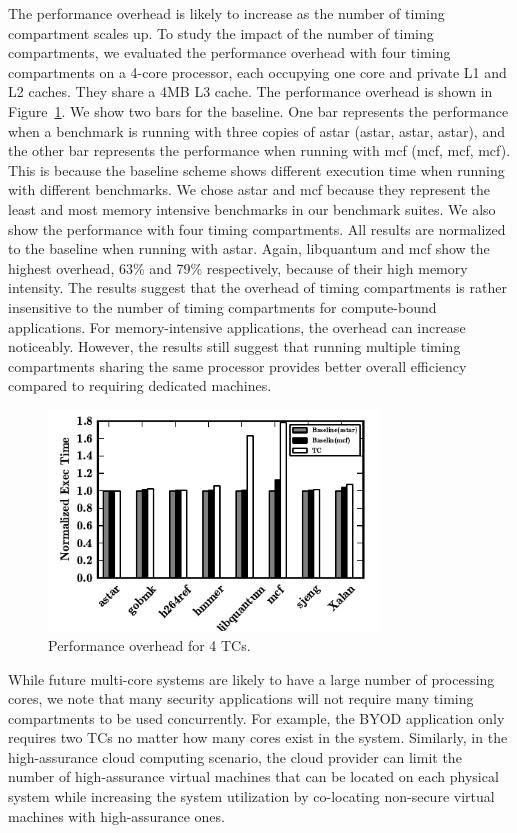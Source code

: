 The performance overhead is likely to increase as the number of timing compartment scales up.
To study the impact of the number of timing compartments,
we evaluated the performance overhead with four timing
compartments on a 4-core processor, each occupying one core and private L1 and L2 caches. 
They share a 4MB L3 cache. The performance
overhead is shown in Figure~\ref{fig:scalability}. 
We show two bars for the baseline. One bar represents the performance when a 
benchmark is running with three copies of astar ({astar, astar, astar}), and the other bar represents the performance when running with mcf ({mcf, mcf, mcf}). 
This
is because the baseline scheme shows different execution time when running with different benchmarks.
We
chose astar and mcf because they represent the least and most memory intensive benchmarks in our benchmark
suites. We also show the performance with four timing compartments. All results are normalized to the baseline when running
with astar. Again, libquantum and mcf show the highest overhead, 63\% and 79\% respectively, because of their 
high memory intensity. 
The results suggest that the overhead of timing compartments is rather insensitive
to the number of timing compartments for compute-bound applications. For memory-intensive
applications, the overhead can increase noticeably. However, the results still suggest
that running multiple timing compartments sharing the same processor provides better
overall efficiency compared to requiring dedicated machines.


\begin{figure}
    \begin{center}
        \includegraphics[width=3.46in]{figs/scalability.pdf}
        \caption{Performance overhead for 4 TCs.}
        \label{fig:scalability}
    \end{center}
\end{figure}

While future multi-core systems are likely to have a large number of processing cores,
we note that many security applications will not require many timing compartments to
be used concurrently. For example, the BYOD application only requires two TCs no matter
how many cores exist in the system. Similarly, in the high-assurance cloud computing
scenario, the cloud provider can limit the number of high-assurance virtual machines
that can be located on each physical system while increasing the system utilization 
by co-locating non-secure virtual machines with high-assurance ones.



